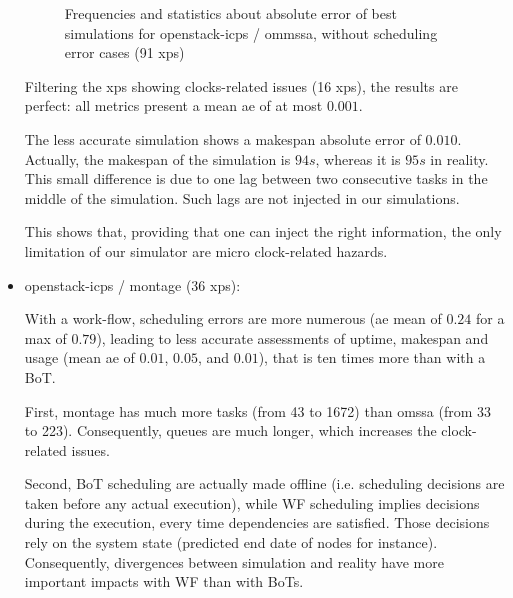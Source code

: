 \begin{itemize}
\begin{figure}
  
      
  

\caption{Frequencies and statistics about absolute error of best simulations for openstack-icps / 
ommssa, without scheduling error cases (91 xps)}
\end{figure}       

      Filtering the xps showing clocks-related issues (16 xps), the results are perfect:
      all metrics present a mean ae of at most $0.001$.
      
      The less accurate simulation shows a makespan absolute error of $0.010$. 
      Actually, the makespan of the simulation is $94s$, whereas it is $95s$ in reality.
      This small difference is due to one lag between two consecutive tasks 
      in the middle of the simulation. Such lags are not injected in our simulations.
      
      This shows that, providing that one can inject the right information, 
      the only limitation of our simulator are micro clock-related hazards.
      
      
 \item openstack-icps / montage (36 xps): 
 
      

      

      With a work-flow, scheduling errors are more numerous 
      (ae mean of $0.24$ for a max of $0.79$), leading to less accurate assessments
      of uptime, makespan and usage (mean ae of $0.01$, $0.05$, and $0.01$), that
      is ten times more than with a BoT.
      
      First, montage has much more tasks (from 43 to 1672) than omssa (from 33 to 223).
      Consequently, queues are much longer, which increases the clock-related issues.
      
      Second, BoT scheduling are actually made offline (i.e. scheduling decisions are taken
      before any actual execution), while WF scheduling implies decisions during 
      the execution, every time dependencies are satisfied. 
      Those decisions rely on the system state (predicted end date of nodes for 
      instance). Consequently, divergences between simulation and reality have
      more important impacts with WF than with BoTs.
      

\end{itemize}

